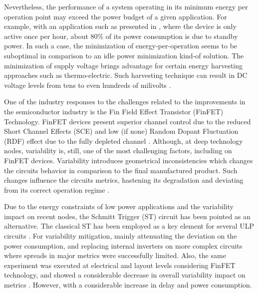 \documentclass[pgmicro,diss,english]{iiufrgs}
\begin{document}
    Nevertheless, the performance of a system operating in its minimum energy per operation point may exceed the power budget of a given application. For example, with an application such as presented in \cite{fojtik2013millimeter}, where the device is only active once per hour, about 80\% of its power consumption is due to standby power. In such a case, the minimization of energy-per-operation seems to be suboptimal in comparison to an idle power minimization kind-of solution. The minimization of supply voltage brings advantage for certain energy harvesting approaches such as thermo-electric. Such harvesting technique can result in DC voltage levels from tens to even hundreds of milivolts \cite{khan2014flexible}. 

    One of the industry responses to the challenges related to the improvements in the semiconductor industry is the Fin Field Effect Transistor (FinFET) Technology. FinFET devices present superior channel control due to the reduced Short Channel Effects (SCE) and low (if none) Random Dopant Fluctuation (RDF) effect due to the fully depleted channel \cite{farkhani2014comparative}. Although, at deep technology nodes, variability is, still, one of the most challenging factors, including on FinFET devices. Variability introduces geometrical inconsistencies which changes the circuits behavior in comparison to the final manufactured product. Such changes influence the circuits metrics, hastening its degradation and deviating from its correct operation regime \cite{abbas:15} \cite{nassif:08}.

    Due to the energy constraints of low power applications and the variability impact on recent nodes, the Schmitt Trigger (ST) circuit has been pointed as an alternative. The classical ST has been employed as a key element for several ULP circuits \cite{kulkarni2007160, 5746345, melek:17, lotze2017ultra}. For variability mitigation, mainly attenuating the deviation on the power consumption, and replacing internal inverters on more complex circuits \cite{dokania2015circuit} where spreads in major metrics were successfully limited. Also, the same experiment was executed at electrical and layout levels considering FinFET technology, and showed a considerable decrease in overall variability impact on metrics \cite{toledo2018pros,moraes2018evaluation}. However, with a considerable increase in delay and power consumption.

\end{document}
